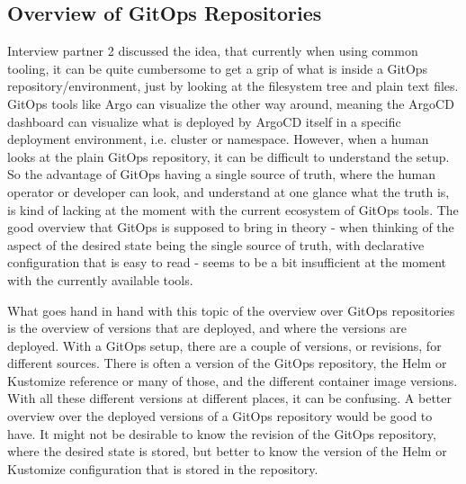 \subsection*{Overview of GitOps Repositories}

Interview partner 2 discussed the idea, that
currently when using common tooling,
it can be quite cumbersome to get a grip of what is inside a GitOps repository/environment,
just by looking at the filesystem tree and plain text files.
GitOps tools like Argo can visualize the other way around,
meaning the ArgoCD dashboard can visualize what is deployed by ArgoCD itself
in a specific deployment environment, i.e. cluster or namespace.
However, when a human looks at the plain GitOps repository,
it can be difficult to understand the setup.
So the advantage of GitOps having a single source of truth,
where the human operator or developer can look,
and understand at one glance what the truth is,
is kind of lacking at the moment with the current ecosystem of GitOps tools.
The good overview that GitOps is supposed to bring in theory
- when thinking of the aspect of the desired state being the single source of truth, with declarative configuration that is easy to read -
seems to be a bit insufficient at the moment with the currently available tools.

%

What goes hand in hand with this topic of the overview over GitOps repositories
is the overview of versions that are deployed,
and where the versions are deployed.
With a GitOps setup, there are a couple of versions, or revisions, for different sources.
There is often a version of the GitOps repository, the Helm or Kustomize reference or many of those,
and the different container image versions.
With all these different versions at different places,
it can be confusing.
A better overview over the deployed versions of a GitOps repository
would be good to have.
It might not be desirable to know the revision of the GitOps repository,
where the desired state is stored,
but better to know the version of the Helm or Kustomize configuration that is stored in the repository.

